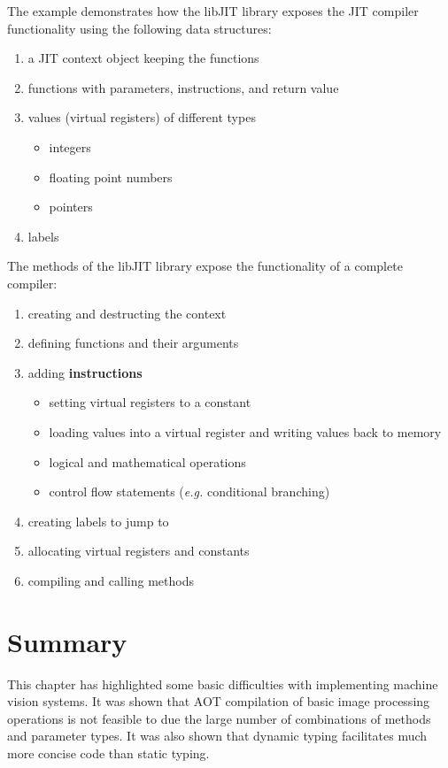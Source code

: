 \documentclass[12pt,a4paper,oneside,openright]{book}
\newcommand{\eg}{\emph{e.g.} }
\begin{document}
\begin{CJK}{UTF8}{}
The example demonstrates how the libJIT library exposes the \ac{JIT} compiler functionality using the following data structures:
\begin{enumerate}
\item a \ac{JIT} context object keeping the functions
\item functions with parameters, instructions, and return value
\item values (virtual registers) of different types
  \begin{itemize}
  \item integers
  \item floating point numbers
  \item pointers
  \end{itemize}
\item labels
\end{enumerate}
The methods of the libJIT library expose the functionality of a complete compiler:
\begin{enumerate}
\item creating and destructing the context
\item defining functions and their arguments
\item adding \textbf{instructions}
  \begin{itemize}
  \item setting virtual registers to a constant
  \item loading values into a virtual register and writing values back to memory
  \item logical and mathematical operations
  \item control flow statements (\eg conditional branching)
  \end{itemize}
\item creating labels to jump to
\item allocating virtual registers and constants
\item compiling and calling methods
\end{enumerate}

\section{Summary}\label{cha:sumstate}
This chapter has highlighted some basic difficulties with implementing machine vision systems. It was shown that \ac{AOT} compilation of basic image processing operations is not feasible to due the large number of combinations of methods and parameter types. It was also shown that dynamic typing facilitates much more concise code than static typing.


\end{CJK}
\end{document}
